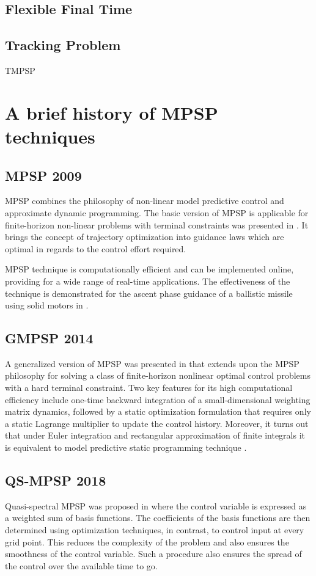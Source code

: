 \documentclass[12pt]{article}
\begin{document}
\subsection{Flexible Final Time}
\subsection{Tracking Problem}
TMPSP

\fi

\section{A brief history of MPSP techniques}

\subsection{MPSP 2009}
MPSP combines the philosophy of non-linear model predictive control and approximate dynamic programming. The basic version of MPSP is applicable for finite-horizon non-linear problems with terminal constraints was presented in \cite{padhi2009model}. It brings the concept of trajectory optimization into guidance laws which are optimal in regards to the control effort required.

MPSP technique is computationally efficient and can be implemented online, providing for a wide range of real-time applications.  The effectiveness of the technique is demonstrated for the ascent phase guidance of a ballistic missile using solid motors in \cite{padhi2009model}.

\subsection{GMPSP 2014}
A generalized version of MPSP was presented in \cite{maity2014generalized} that extends upon the MPSP philosophy for solving a class of finite-horizon nonlinear optimal control problems with a hard terminal constraint. Two key features for its high computational efficiency include one-time backward integration of a small-dimensional weighting matrix dynamics, followed by a static optimization formulation that requires only a static Lagrange multiplier to update the control history. Moreover, it turns out that
under Euler integration and rectangular approximation of finite integrals it is equivalent to model predictive static programming technique \cite{padhi2009model}.

\subsection{QS-MPSP 2018}
Quasi-spectral MPSP was proposed in \cite{mondal2018angle} where the control variable is expressed as a weighted sum of basis functions. The coefficients of the basis functions are then determined using optimization techniques, in contrast, to control input at every grid point. This reduces the complexity of the problem and also ensures the smoothness of the control variable. Such a procedure also ensures the spread of the control over the available time to go.
\end{document}
